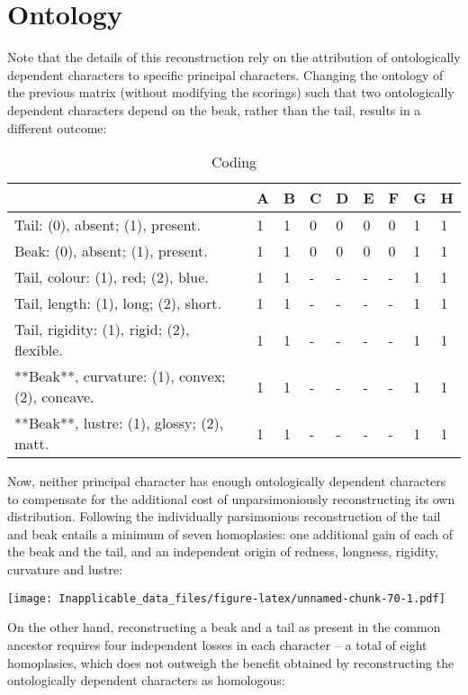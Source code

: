 \documentclass[]{book}
\theoremstyle{definition}
\theoremstyle{definition}
\theoremstyle{definition}
\theoremstyle{remark}
\begin{document}
\section{Ontology}\label{ontology}

Note that the details of this reconstruction rely on the attribution of
ontologically dependent characters to specific principal characters.
Changing the ontology of the previous matrix (without modifying the
scorings) such that two ontologically dependent characters depend on the
beak, rather than the tail, results in a different outcome:

\begin{table}

\caption{\label{tab:unnamed-chunk-69}Coding}
\centering
\begin{tabular}[t]{l|l|l|l|l|l|l|l|l}
\hline
  & A & B & C & D & E & F & G & H\\
\hline
Tail: (0), absent; (1), present. & 1 & 1 & 0 & 0 & 0 & 0 & 1 & 1\\
\hline
Beak: (0), absent; (1), present. & 1 & 1 & 0 & 0 & 0 & 0 & 1 & 1\\
\hline
Tail, colour: (1), red; (2), blue. & 1 & 1 & - & - & - & - & 1 & 1\\
\hline
Tail, length: (1), long; (2), short. & 1 & 1 & - & - & - & - & 1 & 1\\
\hline
Tail, rigidity: (1), rigid; (2), flexible. & 1 & 1 & - & - & - & - & 1 & 1\\
\hline
**Beak**, curvature: (1), convex; (2), concave. & 1 & 1 & - & - & - & - & 1 & 1\\
\hline
**Beak**, lustre: (1), glossy; (2), matt. & 1 & 1 & - & - & - & - & 1 & 1\\
\hline
\end{tabular}
\end{table}

Now, neither principal character has enough ontologically dependent
characters to compensate for the additional cost of unparsimoniously
reconstructing its own distribution. Following the individually
parsimonious reconstruction of the tail and beak entails a minimum of
seven homoplasies: one additional gain of each of the beak and the tail,
and an independent origin of redness, longness, rigidity, curvature and
lustre:

\texttt{[image: Inapplicable\_data\_files/figure-latex/unnamed-chunk-70-1.pdf]}

On the other hand, reconstructing a beak and a tail as present in the
common ancestor requires four independent losses in each character -- a
total of eight homoplasies, which does not outweigh the benefit obtained
by reconstructing the ontologically dependent characters as homologous:
\end{document}
